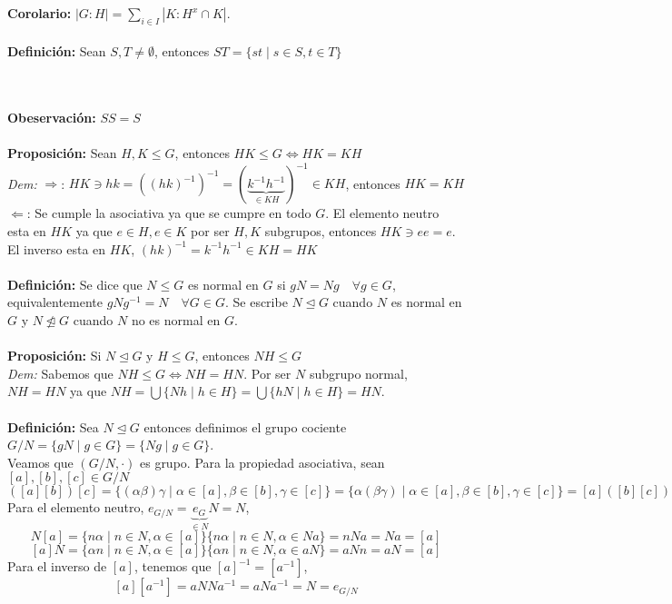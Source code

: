\documentclass{article}
\begin{document}

\textbf{Corolario:} $\displaystyle |G:H|=\sum_{i\in I}|K:H^x\cap K|$.\\\\


\textbf{Definición:} Sean $S,T\ne\emptyset$, entonces $ST=\{st\mid s\in S,t\in T\}$\\\\\


\textbf{Obeservación:} $SS=S$\\\\


\textbf{Proposición:} Sean $H,K\le G$, entonces $HK\le G\Leftrightarrow HK=KH$\\
\textit{Dem:} $\Rightarrow$: $HK\ni hk = ((hk)^{-1})^{-1}=(\underbrace{k^{-1}h^{-1}}_{\in KH})^{-1}\in KH$, entonces $HK=KH$\\
$\Leftarrow$: Se cumple la asociativa ya que se cumpre en todo $G$. El elemento neutro esta en $HK$ ya que $e\in H,e\in K$ por ser $H,K$ subgrupos, entonces $HK\ni ee=e$. El inverso esta en $HK$, $(hk)^{-1}=k^{-1}h^{-1}\in KH=HK$\\\\


\textbf{Definición:} Se dice que $N\le G$ es normal en $G$ si $gN=Ng\quad \forall g\in G$, equivalentemente $gNg^{-1}=N\quad\forall G \in G$. Se escribe $N\trianglelefteq G$ cuando $N$ es normal en $G$ y $N\not\trianglelefteq G$ cuando $N$ no es normal en $G$.\\\\


\textbf{Proposición:} Si $N\trianglelefteq G$ y $H\le G$, entonces $NH\le G$\\
\textit{Dem:} Sabemos que $NH\le G \Leftrightarrow NH=HN$. Por ser $N$ subgrupo normal, $NH=HN$ ya que $NH=\bigcup\{Nh\mid h\in H\}=\bigcup\{hN\mid h\in H\}=HN$.\\\\


\textbf{Definición:} Sea $N\trianglelefteq G$ entonces definimos el grupo cociente $G/N=\{gN\mid g\in G\}=\{Ng\mid g\in G\}$.\\
Veamos que $(G/N,\cdot)$ es grupo. Para la propiedad asociativa, sean $[a],[b],[c]\in G/N$
$$
([a][b])[c]=\{(\alpha\beta)\gamma\mid \alpha\in[a],\beta\in[b],\gamma\in[c]\}=\{\alpha(\beta\gamma)\mid \alpha\in[a],\beta\in[b],\gamma\in[c]\}=[a]([b][c])
$$
Para el elemento neutro, $e_{G/N}=\underbrace{e_G}_{\in N}N=N$,
$$
N[a]=\{n\alpha\mid n\in N,\alpha\in[a]\}\{n\alpha\mid n\in N,\alpha\in Na\} = nNa=Na=[a]
$$
$$
[a]N=\{\alpha n\mid n\in N,\alpha\in[a]\}\{\alpha n\mid n\in N,\alpha\in aN\} = aNn=aN=[a]
$$
Para el inverso de $[a]$, tenemos que $[a]^{-1}=[a^{-1}]$,
$$
[a][a^{-1}]=aNNa^{-1}=aNa^{-1}=N=e_{G/N}
$$\\
\end{document}
